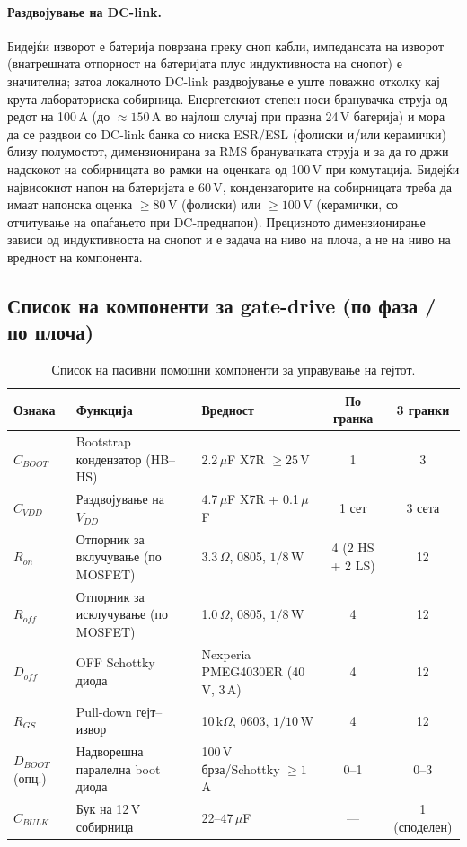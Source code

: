 \documentclass[11pt,a4paper]{article}
\newcommand{\eng}[1]{\textenglish{#1}}
\begin{document}
\paragraph{Раздвојување на DC-link.} Бидејќи изворот е батерија поврзана преку сноп кабли, импедансата на изворот (внатрешната отпорност на батеријата плус индуктивноста на снопот) е значителна; затоа локалното \eng{DC-link} раздвојување е уште поважно отколку кај крута лабораториска собирница. Енергетскиот степен носи бранувачка струја од редот на 100\,A (до $\approx 150$\,A во најлош случај при празна 24\,V батерија) и мора да се раздвои со \eng{DC-link} банка со ниска ESR/ESL (фолиски и/или керамички) близу полумостот, димензионирана за RMS бранувачката струја и за да го држи надскокот на собирницата во рамки на оценката од 100\,V при комутација. Бидејќи највисокиот напон на батеријата е 60\,V, кондензаторите на собирницата треба да имаат напонска оценка $\ge 80$\,V (фолиски) или $\ge 100$\,V (керамички, со отчитување на опаѓањето при DC-преднапон). Прецизното димензионирање зависи од индуктивноста на снопот и е задача на ниво на плоча, а не на ниво на вредност на компонента.

\subsection{Список на компоненти за gate-drive (по фаза / по плоча)}

\begin{table}[h]
\centering
\caption{Список на пасивни помошни компоненти за управување на гејтот.}
\begin{tabularx}{\textwidth}{@{}l L L c c@{}}
\toprule
\textbf{Ознака} & \textbf{Функција} & \textbf{Вредност} & \textbf{По гранка} & \textbf{3 гранки} \\
\midrule
$C_{BOOT}$ & \eng{Bootstrap} кондензатор (HB--HS) & 2.2\,$\mu$F X7R $\ge 25$\,V & 1 & 3 \\
$C_{VDD}$ & Раздвојување на $V_{DD}$ & 4.7\,$\mu$F X7R + 0.1\,$\mu$F & 1 сет & 3 сета \\
$R_{on}$ & Отпорник за вклучување (по MOSFET) & 3.3\,$\Omega$, 0805, $1/8$\,W & 4 (2 HS + 2 LS) & 12 \\
$R_{off}$ & Отпорник за исклучување (по MOSFET) & 1.0\,$\Omega$, 0805, $1/8$\,W & 4 & 12 \\
$D_{off}$ & OFF \eng{Schottky} диода & Nexperia PMEG4030ER (40\,V, 3\,A) & 4 & 12 \\
$R_{GS}$ & \eng{Pull-down} гејт--извор & 10\,k$\Omega$, 0603, $1/10$\,W & 4 & 12 \\
$D_{BOOT}$ (опц.) & Надворешна паралелна \eng{boot} диода & 100\,V брза/\eng{Schottky} $\ge 1$\,A & 0--1 & 0--3 \\
$C_{BULK}$ & Бук на 12\,V собирница & 22--47\,$\mu$F & --- & 1 (споделен) \\
\bottomrule
\end{tabularx}
\end{table}
\end{document}
